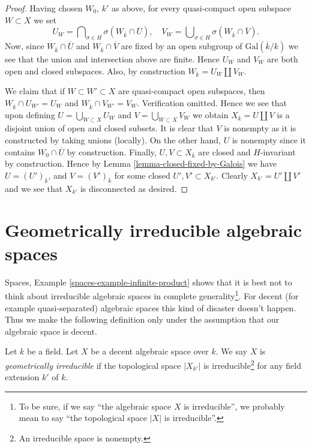 \begin{proof}
\medskip\noindent
Having chosen $W_0$, $k'$ as above, for every quasi-compact open subspace
$W \subset X$ we set
$$
U_W =
\bigcap\nolimits_{\sigma \in H} \sigma(W_{\overline{k}} \cap \overline{U}),
\quad
V_W =
\bigcup\nolimits_{\sigma \in H} \sigma(W_{\overline{k}} \cap \overline{V}).
$$
Now, since $W_{\overline{k}} \cap \overline{U}$ and
$W_{\overline{k}} \cap \overline{V}$ are fixed by an open subgroup of
$\text{Gal}(\overline{k}/k)$ we see that the union and intersection
above are finite. Hence $U_W$ and $V_W$ are both open and closed subspaces.
Also, by construction $W_{\bar k} = U_W \amalg V_W$.

\medskip\noindent
We claim that if $W \subset W' \subset X$ are quasi-compact
open subspaces, then $W_{\overline{k}} \cap U_{W'} = U_W$ and
$W_{\overline{k}} \cap V_{W'} = V_W$. Verification omitted.
Hence we see that upon defining $U = \bigcup_{W \subset X} U_W$
and $V = \bigcup_{W \subset X} V_W$ we obtain
$X_{\overline{k}} = U \amalg V$ is a disjoint union of open
and closed subsets.
It is clear that $V$ is nonempty as it is constructed by taking
unions (locally). On the other hand, $U$ is nonempty since it contains
$W_0 \cap \overline{U}$ by construction. Finally, $U, V \subset X_{\bar k}$
are closed and $H$-invariant by construction. Hence by
Lemma \ref{lemma-closed-fixed-by-Galois}
we have $U = (U')_{\bar k}$, and $V = (V')_{\bar k}$ for some
closed $U', V' \subset X_{k'}$. Clearly $X_{k'} = U' \amalg V'$
and we see that $X_{k'}$ is disconnected as desired.
\end{proof}






\section{Geometrically irreducible algebraic spaces}
\label{section-geometrically-irreducible}

\noindent
Spaces, Example \ref{spaces-example-infinite-product} shows that it
is best not to think about irreducible algebraic spaces in complete
generality\footnote{To be sure, if we say ``the algebraic space $X$
is irreducible'', we probably mean to say ``the topological space $|X|$
is irreducible''.}. For decent (for example quasi-separated) algebraic spaces
this kind of disaster doesn't happen. Thus we make the following
definition only under the assumption that our algebraic space is decent.

\begin{definition}
\label{definition-geometrically-irreducible}
Let $k$ be a field. 
Let $X$ be a decent algebraic space over $k$.
We say $X$ is {\it geometrically irreducible} if the
topological space $|X_{k'}|$ is
irreducible\footnote{An irreducible space is nonempty.}
for any field extension $k'$ of $k$.
\end{definition}

